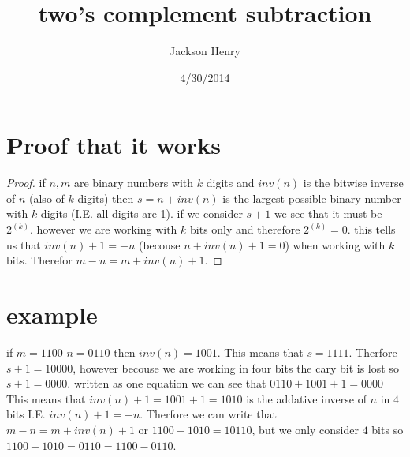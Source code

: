 \documentclass[12pt]{article}
\title{two's complement subtraction}
\author{Jackson Henry}
\date{4/30/2014}
\begin{document}
\maketitle

\section{Proof that it works}
\begin{proof}
if $n,m$ are binary numbers with $k$ digits and $inv(n)$ is the bitwise inverse of $n$ (also of $k$ digits) then $s = n+inv(n)$ is the largest possible binary number with $k$ digits (I.E. all digits are 1). if we consider $s+1$ we see that it must be $2^{(k)}$. however we are working with $k$ bits only and therefore $2^{(k)}=0$. this tells us that $inv(n)+1 = \minus n$ (becouse $n+inv(n)+1=0$) when working with $k$ bits. Therefor $m\minus n=m+inv(n)+1$.
\end{proof}

\section{example}
if $m = 1100$ $n = 0110$ then $inv(n) = 1001$. This means that $s = 1111$. Therfore $s+1=10000$, however becouse we are working in four bits the cary bit is lost so $s+1 = 0000$. written as one equation we can see that $0110+1001+1=0000$ This means that $inv(n)+1=1001+1=1010$ is the addative inverse of $n$ in $4$ bits I.E. $inv(n)+1=\minus n$. Therfore we can write that $m\minus n=m+inv(n)+1$ or $1100+1010=10110$, but we only consider $4$ bits so $1100+1010=0110=1100\minus 0110$.
\end{document}
